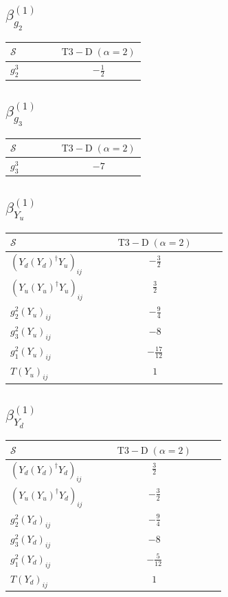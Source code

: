 \documentclass[9pt]{article}
\begin{document}
\subsection*{$ \beta_{g_2}^{(1)} $}
\begin{longtable}{@{}p{0.38\linewidth}c@{}}
\toprule
$\mathcal{S}$ & $ \mathrm{T3-D}\;(\alpha=2) $ \\
\midrule
$ g_2^3 $ & $ - \frac{1}{2} $ \\
\bottomrule
\end{longtable}
\subsection*{$ \beta_{g_3}^{(1)} $}
\begin{longtable}{@{}p{0.38\linewidth}c@{}}
\toprule
$\mathcal{S}$ & $ \mathrm{T3-D}\;(\alpha=2) $ \\
\midrule
$ g_3^3 $ & $ -7 $ \\
\bottomrule
\end{longtable}
\subsection*{$ \beta_{Y_u}^{(1)} $}
\begin{longtable}{@{}p{0.38\linewidth}c@{}}
\toprule
$\mathcal{S}$ & $ \mathrm{T3-D}\;(\alpha=2) $ \\
\midrule
$ (Y_d (Y_d)^{\dagger} Y_u)_{ij} $ & $ - \frac{3}{2} $ \\
$ (Y_u (Y_u)^{\dagger} Y_u)_{ij} $ & $ \frac{3}{2} $ \\
$ g_2^2 (Y_u)_{ij} $ & $ - \frac{9}{4} $ \\
$ g_3^2 (Y_u)_{ij} $ & $ -8 $ \\
$ g_1^2 (Y_u)_{ij} $ & $ - \frac{17}{12} $ \\
$ T (Y_u)_{ij} $ & $ 1 $ \\
\bottomrule
\end{longtable}
\subsection*{$ \beta_{Y_d}^{(1)} $}
\begin{longtable}{@{}p{0.38\linewidth}c@{}}
\toprule
$\mathcal{S}$ & $ \mathrm{T3-D}\;(\alpha=2) $ \\
\midrule
$ (Y_d (Y_d)^{\dagger} Y_d)_{ij} $ & $ \frac{3}{2} $ \\
$ (Y_u (Y_u)^{\dagger} Y_d)_{ij} $ & $ - \frac{3}{2} $ \\
$ g_2^2 (Y_d)_{ij} $ & $ - \frac{9}{4} $ \\
$ g_3^2 (Y_d)_{ij} $ & $ -8 $ \\
$ g_1^2 (Y_d)_{ij} $ & $ - \frac{5}{12} $ \\
$ T (Y_d)_{ij} $ & $ 1 $ \\
\bottomrule
\end{longtable}
\end{document}
